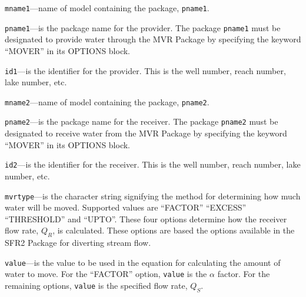\item \texttt{mname1}---name of model containing the package, \texttt{pname1}.

\item \texttt{pname1}---is the package name for the provider.  The package \texttt{pname1} must be designated to provide water through the MVR Package by specifying the keyword ``MOVER'' in its OPTIONS block.

\item \texttt{id1}---is the identifier for the provider.  This is the well number, reach number, lake number, etc.

\item \texttt{mname2}---name of model containing the package, \texttt{pname2}.

\item \texttt{pname2}---is the package name for the receiver.  The package \texttt{pname2} must be designated to receive water from the MVR Package by specifying the keyword ``MOVER'' in its OPTIONS block.

\item \texttt{id2}---is the identifier for the receiver.  This is the well number, reach number, lake number, etc.

\item \texttt{mvrtype}---is the character string signifying the method for determining how much water will be moved.  Supported values are ``FACTOR'' ``EXCESS'' ``THRESHOLD'' and ``UPTO''.  These four options determine how the receiver flow rate, $Q_R$, is calculated.  These options are based the options available in the SFR2 Package for diverting stream flow.

\item \texttt{value}---is the value to be used in the equation for calculating the amount of water to move.  For the ``FACTOR'' option, \texttt{value} is the $\alpha$ factor.  For the remaining options, \texttt{value} is the specified flow rate, $Q_S$.


